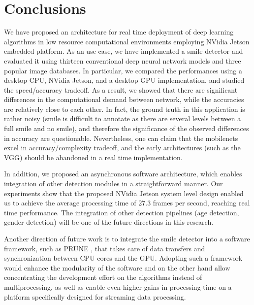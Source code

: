\documentclass[conference]{IEEEtran}
\begin{document}



\section{Conclusions}


We have proposed an architecture for real time deployment of deep learning algorithms in low resource computational environments employing NVidia Jetson embedded platform. As an use case, we have implemented a smile detector and evaluated it using thirteen conventional deep neural network models and three popular image databases.
In particular, we compared the performances using a desktop CPU, NVidia Jetson, and a desktop GPU implementation, and studied the speed/accuracy tradeoff. As a result, we showed that there are significant differences in the computational demand between network, while the accuracies are relatively close to each other. In fact, the ground truth in this application is rather noisy (smile is difficult to annotate as there are several levels between a full smile and no smile), and therefore the significance of the observed differences in accuracy are questionable. Nevertheless, one can claim that the mobilenets excel in accuracy/complexity tradeoff, and the early architectures (such as the VGG) should be abandoned in a real time implementation.

In addition, we proposed an asynchronous software architecture, which enables integration of other detection modules in a straightforward manner. Our experiments show that the proposed NVidia Jetson system level design enabled us to achieve the average processing time of 27.3 frames per second, reaching real time performance. The integration of other detection pipelines (age detection, gender detection) will be one of the future directions in this research.

Another direction of future work is to integrate the smile detector into a software framework, such as PRUNE \cite{prune}, that takes care of data transfers and synchronization between CPU cores and the GPU. Adopting such a framework would enhance the modularity of the software and on the other hand allow concentrating the development effort on the algorithms instead of multiprocessing, as well as enable even higher gains in processing time on a platform specifically designed for streaming data processing.

\begin{table}
 \centering
{}\label{tab:comparison}
\begin{minipage}{0.4\textwidth}
\end{minipage}
\end{table}
\end{document}
